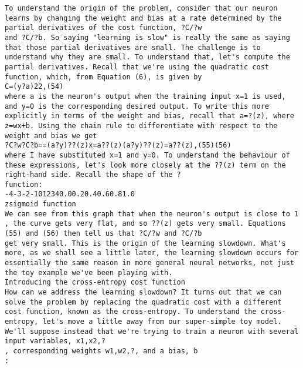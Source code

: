 \begin{lstlisting}
To understand the origin of the problem, consider that our neuron learns by changing the weight and bias at a rate determined by the partial derivatives of the cost function, ?C/?w
and ?C/?b. So saying "learning is slow" is really the same as saying that those partial derivatives are small. The challenge is to understand why they are small. To understand that, let's compute the partial derivatives. Recall that we're using the quadratic cost function, which, from Equation (6), is given by 
C=(y?a)22,(54)
where a is the neuron's output when the training input x=1 is used, and y=0 is the corresponding desired output. To write this more explicitly in terms of the weight and bias, recall that a=?(z), where z=wx+b. Using the chain rule to differentiate with respect to the weight and bias we get 
?C?w?C?b==(a?y)??(z)x=a??(z)(a?y)??(z)=a??(z),(55)(56)
where I have substituted x=1 and y=0. To understand the behaviour of these expressions, let's look more closely at the ??(z) term on the right-hand side. Recall the shape of the ?
function:
-4-3-2-1012340.00.20.40.60.81.0
zsigmoid function
We can see from this graph that when the neuron's output is close to 1
, the curve gets very flat, and so ??(z) gets very small. Equations (55) and (56) then tell us that ?C/?w and ?C/?b
get very small. This is the origin of the learning slowdown. What's more, as we shall see a little later, the learning slowdown occurs for essentially the same reason in more general neural networks, not just the toy example we've been playing with.
Introducing the cross-entropy cost function
How can we address the learning slowdown? It turns out that we can solve the problem by replacing the quadratic cost with a different cost function, known as the cross-entropy. To understand the cross-entropy, let's move a little away from our super-simple toy model. We'll suppose instead that we're trying to train a neuron with several input variables, x1,x2,?
, corresponding weights w1,w2,?, and a bias, b
: 


\end{lstlisting}
